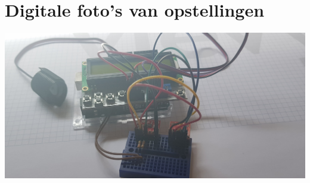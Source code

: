 \documentclass[a4paper]{report}
\begin{document}
    \section{Digitale foto’s van opstellingen}
        \includegraphics[width=\textwidth]{Fysieke_Voorstelling1}\\
\end{document}
